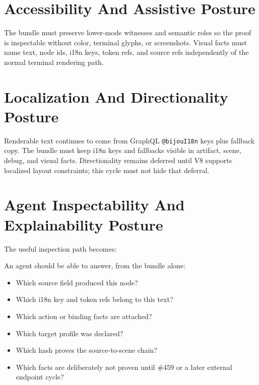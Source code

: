 \section{Accessibility And Assistive Posture}\label{record-145-accessibility-and-assistive-posture}

The bundle must preserve lower-mode witnesses and semantic roles so the proof is inspectable without color, terminal glyphs, or screenshots. Visual facts must name text, node ids, i18n keys, token refs, and source refs independently of the normal terminal rendering path.

\section{Localization And Directionality Posture}\label{record-145-localization-and-directionality-posture}

Renderable text continues to come from GraphQL \texttt{@\allowbreak{}b\allowbreak{}i\allowbreak{}j\allowbreak{}o\allowbreak{}u\allowbreak{}I\allowbreak{}1\allowbreak{}8\allowbreak{}n} keys plus fallback copy. The bundle must keep i18n keys and fallbacks visible in artifact, scene, debug, and visual facts. Directionality remains deferred until V8 supports localized layout constraints; this cycle must not hide that deferral.

\section{Agent Inspectability And Explainability Posture}\label{record-145-agent-inspectability-and-explainability-posture}

The useful inspection path becomes:



An agent should be able to answer, from the bundle alone:

\begin{itemize}
\tightlist
\item
  Which source field produced this node?
\item
  Which i18n key and token refs belong to this text?
\item
  Which action or binding facts are attached?
\item
  Which target profile was declared?
\item
  Which hash proves the source-to-scene chain?
\item
  Which facts are deliberately not proven until \#459 or a later external endpoint cycle?
\end{itemize}

